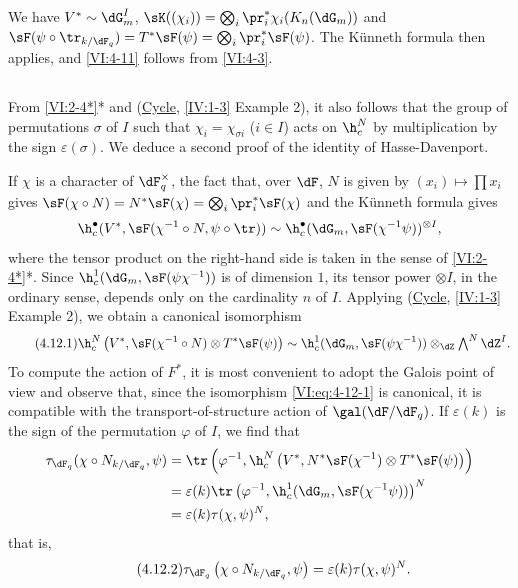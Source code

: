\documentclass[oneside]{book}
\begin{document}
We have $V^\ast\sim \dG_m^I$, 
$\sK((\chi_i)) = \bigotimes_i \pr_i^\ast \chi_i(K_n(\dG_m))$ and 
$\sF(\psi\circ \tr_{k/\dF_q})=T^\ast \sF(\psi) = \bigotimes_i \pr_i^\ast \sF(\psi)$. 
The K\"unneth formula then applies, and \ref{VI:4-11} follows from 
\ref{VI:4-3}. 





\subsection{}\label{VI:4-12}

From \ref{VI:2-4*}* and (\hyperref[IV]{Cycle}, \ref{IV:1-3} Example 2), it also follows 
that the group of permutations $\sigma$ of $I$ such that 
$\chi_i = \chi_{\sigma i}$ ($i\in I$) acts on $\h_c^N$ by multiplication by 
the sign $\varepsilon(\sigma)$. We deduce a second proof 
of the identity of Hasse-Davenport. 

If $\chi$ is a character of $\dF_q^\times$, the fact that, over $\dF$, $N$ 
is given by $(x_i)\mapsto \prod x_i$ gives 
$\sF(\chi\circ N)=N^\ast\sF(\chi) = \bigotimes_i \pr_i^\ast\sF(\chi)$ 
and the K\"unneth formula gives 
\[
  \h_c^\bullet(V^\ast,\sF(\chi^{-1}\circ N,\psi\circ \tr)) \sim \h_c^\bullet(\dG_m,\sF(\chi^{-1}\psi))^{\otimes I} \text{,} 
\]
where the tensor product on the right-hand side is taken in the sense of 
\ref{VI:2-4*}*. Since $\h_c^1(\dG_m,\sF(\psi\chi^{-1}))$ is of dimension 
$1$, its tensor power $\otimes I$, in the ordinary sense, depends only on 
the cardinality $n$ of $I$. Applying (\hyperref[IV]{Cycle}, \ref{IV:1-3} Example 
2), we obtain a canonical isomorphism 
\begin{equation*}\tag{4.12.1}\label{VI:eq:4-12-1}
  \h_c^N\left(V^\ast,\sF(\chi^{-1}\circ N)\otimes T^\ast \sF(\psi)\right) \sim \h_c^1(\dG_m,\sF(\psi\chi^{-1})) \otimes_\dZ \textstyle \bigwedge^N \dZ^I \text{.}
\end{equation*}
To compute the action of $F^\ast$, it is most convenient to adopt the Galois 
point of view and observe that, since the isomorphism \eqref{VI:eq:4-12-1} is 
canonical, it is compatible with the transport-of-structure action of 
$\gal(\dF/\dF_q)$. If $\varepsilon(k)$ is the sign of the permutation 
$\varphi$ of $I$, we find that 
\begin{align*} 
  \tau_{\dF_q}(\chi\circ N_{k/\dF_q},\psi) 
    &= \tr\left(\varphi^{-1},\h_c^N\left(V^\ast,N^\ast\sF(\chi^{-1})\otimes T^\ast \sF(\psi)\right)\right) \\ 
    &= \varepsilon(k) \tr\left(\varphi^{-1},\h_c^1(\dG_m,\sF(\chi^{-1}\psi))\right)^N \\
    &= \varepsilon(k) \tau(\chi,\psi)^N \text{,} 
\end{align*}
that is, 
\begin{equation*}\tag{4.12.2}\label{VI:eq:4-12-2}
  \tau_{\dF_q}\left(\chi\circ N_{k/\dF_q},\psi\right) = \varepsilon(k) \tau(\chi,\psi)^N \text{.} 
\end{equation*}
\end{document}
